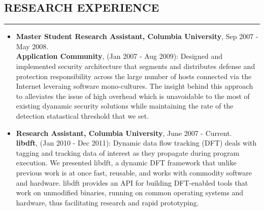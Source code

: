 \documentclass[10pt,a4]{article}
\begin{document}
\begin{small}
\begin{itemize}
\end{itemize}

\subsection*{RESEARCH EXPERIENCE}
\hrule
\vspace{0.2cm}
\begin{itemize}
\item {\bf Master Student Research Assistant, Columbia University}, Sep 2007 - May 2008. \\
%
  {\bf Application Community}, (Jan 2007 - Aug 2009): Designed and implemented
  security architecture that segments and distributes defense and protection
  responsibility across the large number of hosts connected via the Internet
  leveraing software mono-cultures. The insight behind this approach to
  alleviates the issue of high overhead which is unavoidable to the most of
  existing dyanamic security solutions while maintaining the rate of the
  detection statastical threshold that we set.

\vspace{0.1cm}
\item  {\bf Research Assistant, Columbia University}, June 2007 - Current. \\
%
%   
  {\bf libdft}, (Jan 2010 - Dec 2011): Dynamic data flow tracking (DFT) deals
  with tagging and tracking data of interest as they propagate during program
  execution.  We presented libdft, a dynamic DFT framework that unlike previous
  work is at once fast, reusable, and works with commodity software and
  hardware. libdft provides an API for building DFT-enabled tools that work on
  unmodified binaries, running on common operating systems and hardware, thus
  facilitating research and rapid prototyping.\\


\end{itemize}
\end{small}
\end{document}
